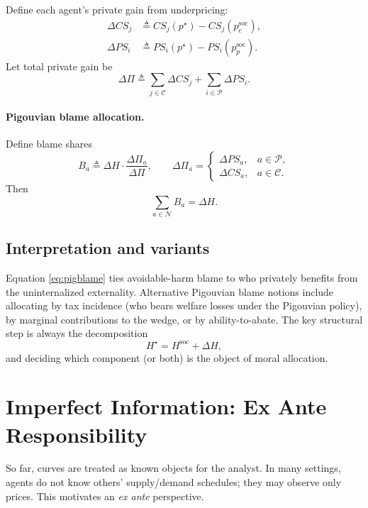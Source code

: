 \documentclass[journal, a4paper]{IEEEtran}
\begin{document}
Define each agent's private gain from underpricing:
\begin{align}
\Delta CS_j &\triangleq CS_j(p^\star)-CS_j(p_c^{\text{soc}}),\\
\Delta PS_i &\triangleq PS_i(p^\star)-PS_i(p_p^{\text{soc}}).
\end{align}
Let total private gain be
\begin{equation}
\Delta \Pi \triangleq \sum_{j\in \mathcal{C}}\Delta CS_j + \sum_{i\in \mathcal{P}}\Delta PS_i.
\end{equation}

\paragraph{Pigouvian blame allocation.}
Define blame shares
\begin{equation}
B_a \triangleq
\Delta H\cdot \frac{\Delta \Pi_a}{\Delta \Pi},
\qquad
\Delta \Pi_a=
\begin{cases}
\Delta PS_a, & a\in \mathcal{P},\\
\Delta CS_a, & a\in \mathcal{C}.
\end{cases}
\label{eq:pigblame}
\end{equation}
Then
\begin{equation}
\sum_{a\in \mathcal{N}} B_a = \Delta H.
\end{equation}

\subsection{Interpretation and variants}
Equation \eqref{eq:pigblame} ties avoidable-harm blame to who privately benefits from the uninternalized externality. Alternative Pigouvian blame notions include allocating by tax incidence (who bears welfare losses under the Pigouvian policy), by marginal contributions to the wedge, or by ability-to-abate. The key structural step is always the decomposition
\begin{equation}
H^\star = H^{\text{soc}} + \Delta H,
\end{equation}
and deciding which component (or both) is the object of moral allocation.

\section{Imperfect Information: Ex Ante Responsibility}
So far, curves are treated as known objects for the analyst. In many settings, agents do not know others' supply/demand schedules; they may observe only prices. This motivates an \emph{ex ante} perspective.
\end{document}

